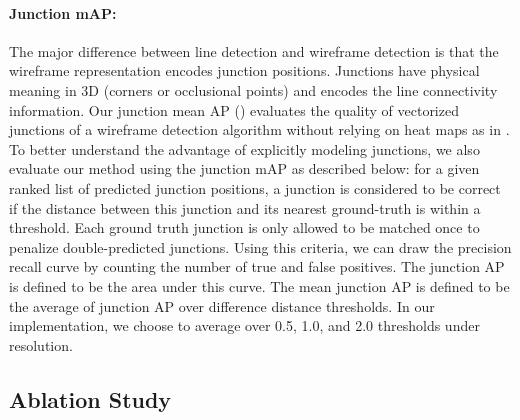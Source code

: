 \documentclass[10pt,twocolumn,letterpaper]{article}
\begin{document}
\paragraph{Junction mAP:}  The major difference between line detection and wireframe detection is that the wireframe representation encodes junction positions. Junctions have physical meaning in 3D (corners or occlusional points) and encodes the line connectivity information. Our junction mean AP () evaluates the quality of vectorized junctions of a wireframe detection algorithm without relying on heat maps as in \cite{Huang:2018:LPW}. To better understand the advantage of explicitly modeling junctions, we also evaluate our method using the junction mAP as described below: for a given ranked list of predicted junction positions, a junction is considered to be correct if the  distance between this junction and its nearest ground-truth is within a threshold.  Each ground truth junction is only allowed to be matched once to penalize double-predicted junctions.  Using this criteria, we can draw the precision recall curve by counting the number of true and false positives.  The junction AP is defined to be the area under this curve.  The mean junction AP is defined to be the average of junction AP over difference distance thresholds. In our implementation, we choose to average over 0.5, 1.0, and 2.0 thresholds under  resolution.

\subsection{Ablation Study}
\end{document}

